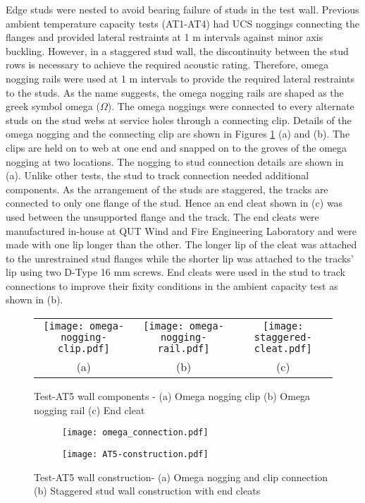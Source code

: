 Edge studs were nested to avoid bearing failure of studs in the test wall. Previous ambient temperature capacity tests (AT1-AT4) had UCS noggings connecting the flanges and provided lateral restraints at 1 m intervals against minor axis buckling. However, in a staggered stud wall, the discontinuity between the stud rows is necessary to achieve the required acoustic rating. Therefore, omega nogging rails were used at 1 m intervals to provide the required lateral restraints to the studs. As the name suggests, the omega nogging rails are shaped as the greek symbol omega ($\Omega$). The omega noggings were connected to every alternate studs on the stud webs at service holes through a connecting clip. Details of the omega nogging and the connecting clip are shown in Figures \ref{fig:Omega-nogging-connections} (a) and (b). The clips are held on to web at one end and snapped on to the groves of the omega nogging at two locations. The nogging to stud connection details are shown in  (a). Unlike other tests, the stud to track connection needed additional components. As the arrangement of the studs are staggered, the tracks are connected to only one flange of the stud. Hence an end cleat shown in  (c) was used between the unsupported flange and the track. The end cleats were manufactured in-house at QUT Wind and Fire Engineering Laboratory and were made with one lip longer than the other. The longer lip of the cleat was attached to the unrestrained stud flanges while the shorter lip was attached to the tracks' lip using two D-Type 16 mm screws. End cleats were used in the stud to track connections to improve their fixity conditions in the ambient capacity test as shown in  (b). 
\begin{figure}[!htbp]
	\centering
		\begin{tabular}{ccc}
			\texttt{[image: omega-nogging-clip.pdf]} & 
			\texttt{[image: omega-nogging-rail.pdf]} & 
			\texttt{[image: staggered-cleat.pdf]} \\
			(a) & (b) & (c) \\ 
		\end{tabular} 
		\caption{Test-AT5 wall components - (a) Omega nogging clip (b) Omega nogging rail (c) End cleat}
		\label{fig:Omega-nogging-connections}
\end{figure}
\begin{figure}[!htbp]
	\centering
	\begin{subfigure}[b]{0.5\textwidth}
		\centering
		\texttt{[image: omega\_connection.pdf]}
		\caption{}
		\label{subfig:omega_connection}
	\end{subfigure}
	\begin{subfigure}[b]{0.8\textwidth}
		\centering
		\texttt{[image: AT5-construction.pdf]}
		\caption{}
		\label{subfig:AT5-wall-construction}
	\end{subfigure}
	   \caption{Test-AT5 wall construction- (a) Omega nogging and clip connection (b) Staggered stud wall construction with end cleats}
	   \label{fig:AT5-construction}
\end{figure}
